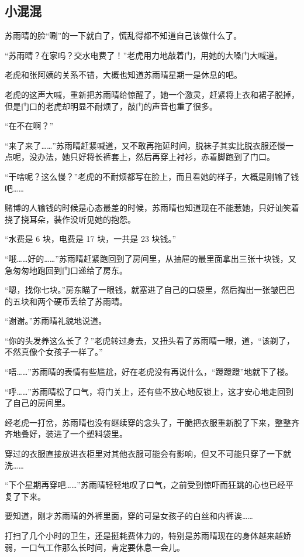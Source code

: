 \subsection{小混混}

苏雨晴的脸“唰”的一下就白了，慌乱得都不知道自己该做什么了。

“苏雨晴？在家吗？交水电费了！”老虎用力地敲着门，用她的大嗓门大喊道。

老虎和张阿姨的关系不错，大概也知道苏雨晴星期一是休息的吧。

老虎的这声大喊，重新把苏雨晴给惊醒了，她一个激灵，赶紧将上衣和裙子脱掉，但是门口的老虎却明显不耐烦了，敲门的声音也重了很多。

“在不在啊？”

“来了来了……”苏雨晴赶紧喊道，又不敢再拖延时间，脱袜子其实比脱衣服还慢一点呢，没办法，她只好将长裤套上，然后再穿上衬衫，赤着脚跑到了门口。

“干啥呢？这么慢？”老虎的不耐烦都写在脸上，而且看她的样子，大概是刚输了钱吧……

赌博的人输钱的时候是心态最差的时候，苏雨晴也知道现在不能惹她，只好讪笑着挠了挠耳朵，装作没听见她的抱怨。

“水费是 6 块，电费是 17 块，一共是 23 块钱。”

“哦……好的……”苏雨晴赶紧跑回到了房间里，从抽屉的最里面拿出三张十块钱，又急匆匆地跑回到门口递给了房东。

“嗯，找你七块。”房东瞄了一眼钱，就塞进了自己的口袋里，然后掏出一张皱巴巴的五块和两个硬币丢给了苏雨晴。

“谢谢。”苏雨晴礼貌地说道。

“你的头发养这么长了？”老虎转过身去，又扭头看了苏雨晴一眼，道，“该剃了，不然真像个女孩子一样了。”

“唔……”苏雨晴的表情有些尴尬，好在老虎没有再说什么，“蹬蹬蹬”地就下了楼。

“呼……”苏雨晴松了口气，将门关上，还有些不放心地反锁上，这才安心地走回到了自己的房间里。

经老虎一打岔，苏雨晴也没有继续穿的念头了，干脆把衣服重新脱了下来，整整齐齐地叠好，装进了一个塑料袋里。

穿过的衣服直接放进衣柜里对其他衣服可能会有影响，但又不可能只穿了一下就洗……

“下个星期再穿吧……”苏雨晴轻轻地叹了口气，之前受到惊吓而狂跳的心也已经平复了下来。

要知道，刚才苏雨晴的外裤里面，穿的可是女孩子的白丝和内裤诶……

打扫了几个小时的卫生，还是挺耗费体力的，特别是苏雨晴现在的身体越来越娇弱，一口气工作那么长时间，肯定要休息一会儿。

